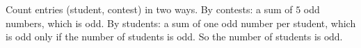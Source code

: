 Count entries (student, contest) in two ways. By contests: a sum of $5$ odd numbers, which is odd. By students: a sum of one odd number per student, which is odd only if the number of students is odd. So the number of students is $\boxed{\text{odd}}$.
